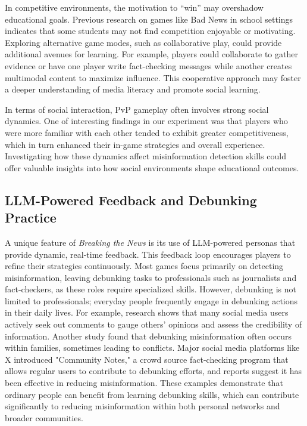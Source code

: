 In competitive environments, the motivation to “win” may overshadow educational goals. Previous research on games like Bad News in school settings indicates that some students may not find %
competition enjoyable or motivating\cite{axelsson2024bad}. Exploring alternative game modes, such as collaborative play, could provide additional avenues for learning. For example, players could collaborate to gather evidence or have one player write fact-checking messages while another creates multimodal content to maximize influence. This cooperative approach may foster a deeper understanding of media literacy and promote social learning.

In terms of social interaction, PvP gameplay often involves strong social dynamics. One of interesting findings in our experiment was that players who were more familiar with each other tended to exhibit greater competitiveness, which in turn enhanced their in-game strategies and overall experience. Investigating how these dynamics affect misinformation detection skills could offer valuable insights into how social environments shape educational outcomes.

\subsection{LLM-Powered Feedback and Debunking Practice}
A unique feature of \textit{Breaking the News} is its use of LLM-powered personas that provide dynamic, real-time feedback. This feedback loop encourages players to refine their strategies continuously. Most games focus primarily on detecting misinformation\cite{katsaounidou2019mathe,tang2024mystery,clever2020fakeyou}, leaving debunking tasks to professionals such as journalists and fact-checkers, as these roles require specialized skills. However, debunking is not limited to professionals; everyday people frequently engage in debunking actions in their daily lives. For example, research shows that many social media users actively seek out comments to gauge others' opinions and assess the credibility of information\cite{geeng2020fake}. Another study found that debunking misinformation often occurs within families, sometimes leading to conflicts\cite{scott2023figured}. Major social media platforms like X introduced "Community Notes,"\cite{xcommunitynotes2024} a crowd source fact-checking program that allows regular users to contribute to debunking efforts, and reports suggest it has been effective in reducing misinformation\cite{chuai2024community}. These examples demonstrate that ordinary people can benefit from learning debunking skills, which can contribute significantly to reducing misinformation within both personal networks and broader communities.

